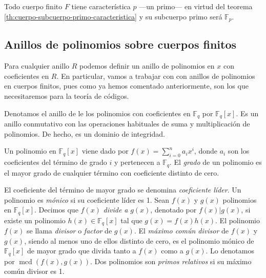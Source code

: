 Todo cuerpo finito \(F\) tiene característica \(p\) —un primo— en virtud del teorema \ref{th:cuerpo-subcuerpo-primo-caracteristica} y su subcuerpo primo será \(\mathbb F_p\).


\subsection{Anillos de polinomios sobre cuerpos finitos}

Para cualquier anillo \(R\) podemos definir un anillo de polinomios en \(x\) con coeficientes en \(R\). En particular, vamos a trabajar con con anillos de polinomios en cuerpos finitos, pues como ya hemos comentado anteriormente, son los que necesitaremos para la teoría de códigos.

Denotamos el anillo de le los polinomios con coeficientes en \(\mathbb F_q\) por \(\mathbb F_q[x]\).
Es un anillo conmutativo con las operaciones habituales de suma y multiplicación de polinomios.
De hecho, es un dominio de integridad.

Un polinomio en \(\mathbb F_q[x]\) viene dado por \(f(x) = \sum_{i=0}^n a_ix^i\), donde \(a_i\) son los coeficientes del término de grado \(i\) y pertenecen a \(\mathbb F_q\).
El \textit{grado} de un polinomio es el mayor grado de cualquier término con coeficiente distinto de cero.


\begin{proposition}
  \label{prop:raices-factores-pol-Fq}
\end{proposition}

El coeficiente del término de mayor grado se denomina \textit{coeficiente líder}.
Un polinomio es \textit{mónico} si su coeficiente líder es 1.
Sean \(f(x)\) y \(g(x)\) polinomios en \(\mathbb F_q[x]\).
Decimos que \(f(x)\) \textit{divide a} \(g(x)\), denotado por \(f(x) | g(x)\), si existe un polinomio \(h(x) \in \mathbb F_q[x]\) tal que \(g(x) = f(x)h(x)\).
El polinomio \(f(x)\) se llama \textit{divisor} o \textit{factor} de \(g(x)\).
El \textit{máximo común divisor} de \(f(x)\) y \(g(x)\), siendo al menos uno de ellos distinto de cero, es el polinomio mónico de \(\mathbb F_q[x]\) de mayor grado que divida tanto a \(f(x)\) como a \(g(x)\).
Lo denotamos por \(\operatorname{mcd}(f(x), g(x))\).
Dos polinomios son \textit{primos relativos} si su máximo común divisor es 1.


